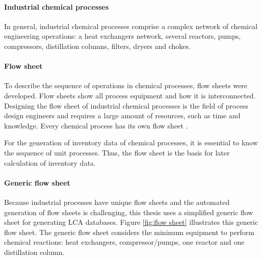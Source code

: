 \paragraph{Industrial chemical processes}
In general, industrial chemical processes comprise a complex network of chemical engineering operations: a heat exchangers network, several reactors, pumps, compressors, distillation columns, filters, dryers and chokes. 

\paragraph{Flow sheet}To describe the sequence of operations in chemical processes, flow sheets were developed. Flow sheets show all process equipment and how it is interconnected. Designing the flow sheet of industrial chemical processes is the field of process design engineers and requires a large amount of resources, such as time and knowledge. Every chemical process has its own flow sheet  \cite{Douglas.1985}. 

For the generation of inventory data of chemical processes, it is essential to know the sequence of unit processes. Thus, the flow sheet is the basis for later calculation of inventory data.  

\paragraph{Generic flow sheet} Because industrial processes have unique flow sheets and the automated generation of flow sheets is challenging, this thesis uses a simplified generic flow sheet for generating LCA databases. Figure \ref{fig:flow sheet} illustrates this generic flow sheet. The generic flow sheet considers the minimum equipment to perform chemical reactions: heat exchangers, compressor/pumps, one reactor and one distillation column.

